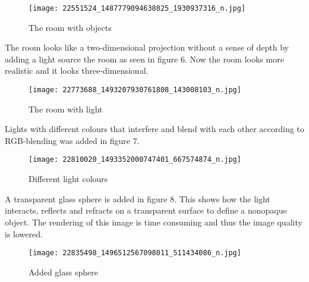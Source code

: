 \documentclass[a4paper,12pt,oneside,final]{report}
\begin{document}
\begin{figure}[h!]
\begin{center}
\texttt{[image: 22551524\_1487779094638025\_1930937316\_n.jpg]}
\end{center}
\caption{The room with objects}
\end{figure}

The room looks like a two-dimensional projection without a sense of depth by adding a light source the room as seen in figure 6. Now the room looks more realistic and it looks three-dimensional. 

\begin{figure}[h!]
\begin{center}
\texttt{[image: 22773688\_1493207930761808\_143008103\_n.jpg]}
\end{center}
\caption{The room with light}
\end{figure}

Lights with different colours that interfere and blend with each other according to RGB-blending was added in figure 7.
\begin{figure}[h!]
\begin{center}
\texttt{[image: 22810020\_1493352000747401\_667574874\_n.jpg]}
\end{center}
\caption{Different light colours}
\end{figure}

A transparent glass sphere is added in figure 8. This shows how the light interacts, reflects and refracts on a transparent surface to define a nonopaque object. The rendering of this image is time consuming and thus the image quality is lowered. 
\begin{figure}[h!]
\begin{center}
\texttt{[image: 22835498\_1496512567098011\_511434086\_n.jpg]}
\end{center}
\caption{Added glass sphere}
\end{figure}
\end{document}
